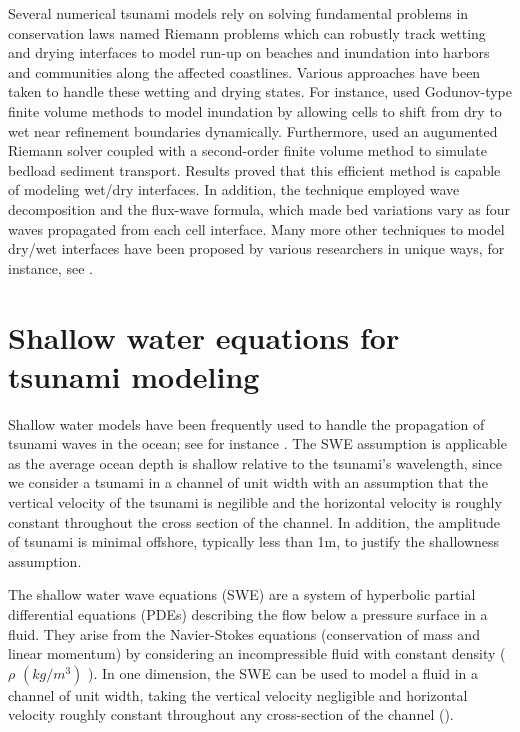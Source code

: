 \documentclass[10pt,a4paper]{article}
\begin{document}
				Several numerical tsunami models rely on solving fundamental problems in conservation laws named Riemann problems which can robustly track wetting and drying interfaces to model run-up on beaches and inundation into harbors and communities along the affected coastlines.  Various approaches have been taken to handle these wetting and drying states. For instance, \citet{ge:2011,li-ta-wa-ca-ba-ch-li:2021,fivser2016mass} used Godunov-type finite volume methods to model inundation by allowing cells to shift from dry to wet near refinement boundaries dynamically. Furthermore, \citet{barzgaran2019numerical}  used an augumented Riemann solver coupled with a second-order finite volume method to simulate bedload sediment transport. Results proved that this efficient method is capable of modeling wet/dry interfaces.  In addition, the technique employed wave decomposition and the flux-wave formula, which made bed variations vary as four waves propagated from each cell interface. Many more other techniques to model dry/wet interfaces have been proposed by various researchers in unique ways, for instance, see \citet{po:2015, po:2018, pe-bo-ma:2011, toro2001shock, chaabelasri1849simple,nikolos2009unstructured,huang2013well, bi2014finite,song2011unstructured,buttinger2019fast}.
		

	\section{Shallow water equations for tsunami modeling}
	\label{sec2}
	Shallow water models have been frequently used to handle the propagation of tsunami waves in the ocean; see for instance \citet{dutykh2007water,le-ge-be:2011,dias2007dynamics}. The SWE assumption is applicable as the average ocean depth is shallow relative to the tsunami's wavelength, since we consider a tsunami in a channel of unit width with an assumption that the vertical velocity of the tsunami  is negilible and the horizontal velocity is roughly constant throughout the cross section of the channel. In addition, the amplitude of tsunami is minimal offshore, typically less than 1m, to justify the shallowness assumption. 
	
		The shallow water wave equations (SWE) are a system of hyperbolic partial differential equations (PDEs) describing the flow below a pressure surface in a fluid. They arise from the Navier-Stokes equations (conservation of mass and linear momentum) by considering an incompressible fluid with constant density ($\rho$ $(kg/m^{3})$ ).  In one dimension, the SWE  can be used to model a fluid in a channel of unit width, taking the vertical velocity negligible and horizontal velocity roughly constant throughout any cross-section of the channel (\cite{ge:2008}).  
		
\end{document}
